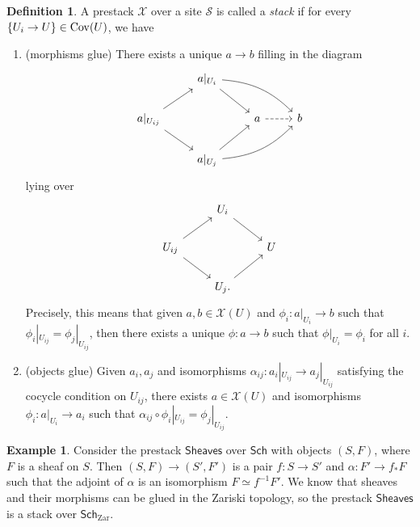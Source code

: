 \documentclass[leqno, openany]{memoir}
\theoremstyle{definition}
\newtheorem{defn}[thm]{Definition}
\newtheorem{exm}[thm]{Example}
\theoremstyle{remark}
\theoremstyle{plain}
\theoremstyle{definition}
\theoremstyle{remark}
\newcommand{\mc}[1]{\mathcal{#1}}
\newcommand{\mr}[1]{\mathrm{#1}}
\newcommand{\ms}[1]{\mathsf{#1}}
\newcommand{\on}[1]{\operatorname{#1}}
\begin{document}
\begin{defn}
    A prestack $\mc{X}$ over a site $\mc{S}$ is called a \textit{stack} if for every $\qty{U_i \to U} \in \on{Cov}(U)$, we have
    \begin{enumerate}
        \item (morphisms glue) There exists a unique $a \to b$ filling in the diagram
            \begin{equation*}
            \begin{tikzcd}
                & a|_{U_i} \ar[bend left=20]{drr} \ar{dr} \\
                a|_{U_{ij}} \ar{ur} \ar{dr} & & a \ar[dashrightarrow]{r} & b \\
                & a|_{U_j} \ar[bend right=20]{urr} \ar{ur}
            \end{tikzcd}
            \end{equation*}
            lying over
            \begin{equation*}
            \begin{tikzcd}
                & {U_i} \ar{dr} \\
                {U_{ij}} \ar{ur} \ar{dr} & & U \\
                & {U_j}. \ar{ur}
            \end{tikzcd}
            \end{equation*}
            Precisely, this means that given $a, b \in \mc{X}(U)$ and $\phi_i \colon a |_{U_i} \to b$ such that $\phi_i |_{U_{ij}} = \phi_j |_{U_{ij}}$, then there exists a unique $\phi \colon a \to b$ such that $\phi |_{U_i} = \phi_i$ for all $i$.
        \item (objects glue) Given $a_i, a_j$ and isomorphisms $\alpha_{ij} \colon a_i |_{U_{ij}} \to a_j |_{U_{ij}}$ satisfying the cocycle condition on $U_{ij}$, there exists $a \in \mc{X}(U)$ and isomorphisms $\phi_i \colon a|_{U_i} \to a_i$ such that $\alpha_{ij} \circ \phi_i |_{U_{ij}} = \phi_j |_{U_{ij}}$.
    \end{enumerate}
\end{defn}

\begin{exm}
    Consider the prestack $\ms{Sheaves}$ over $\ms{Sch}$ with objects $(S, F)$, where $F$ is a sheaf on $S$. Then $(S,F) \to (S', F')$ is a pair $f \colon S \to S'$ and $\alpha \colon F' \to f_* F$ such that the adjoint of $\alpha$ is an isomorphism $F \simeq f^{-1} F'$. We know that sheaves and their morphisms can be glued in the Zariski topology, so the prestack $\ms{Sheaves}$ is a stack over $\ms{Sch}_{\mr{Zar}}$.
\end{exm}
\end{document}
